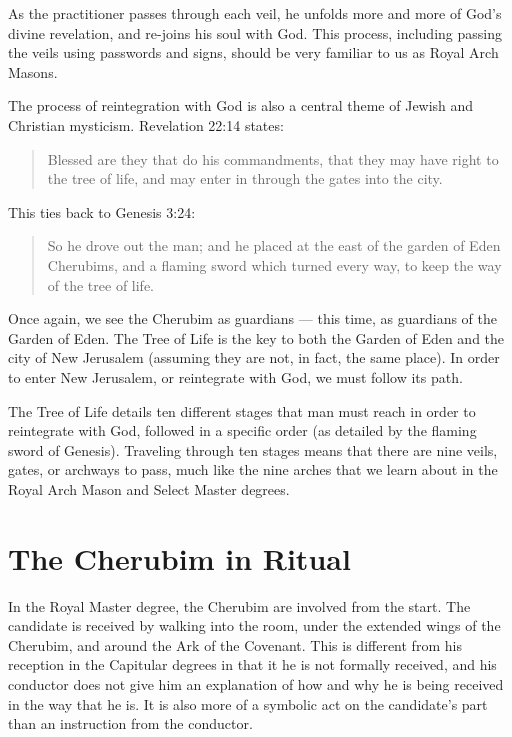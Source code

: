 \documentclass[letterpaper,11pt]{article}
\begin{document}
	As the practitioner passes through each veil, he unfolds more and more of God's divine revelation, and re-joins his soul with God. This process, including passing the veils using passwords and signs, should be very familiar to us as Royal Arch Masons.
	
	The process of reintegration with God is also a central theme of Jewish and Christian mysticism. Revelation 22:14 states:
	
	\begin{quote}
		Blessed are they that do his commandments, that they may have right to the tree of life, and may enter in through the gates into the city.
	\end{quote}

	This ties back to Genesis 3:24:
	
	\begin{quote}
		So he drove out the man; and he placed at the east of the garden of Eden Cherubims, and a flaming sword which turned every way, to keep the way of the tree of life.
	\end{quote}

	Once again, we see the Cherubim as guardians --- this time, as guardians of the Garden of Eden. The Tree of Life is the key to both the Garden of Eden and the city of New Jerusalem (assuming they are not, in fact, the same place). In order to enter New Jerusalem, or reintegrate with God, we must follow its path.
	
	The Tree of Life details ten different stages that man must reach in order to reintegrate with God, followed in a specific order (as detailed by the flaming sword of Genesis). Traveling through ten stages means that there are nine veils, gates, or archways to pass, much like the nine arches that we learn about in the Royal Arch Mason and Select Master degrees.
	
	\section*{The Cherubim in Ritual}
	
	In the Royal Master degree, the Cherubim are involved from the start. The candidate is received by walking into the room, under the extended wings of the Cherubim, and around the Ark of the Covenant. This is different from his reception in the Capitular degrees in that it he is not formally received, and his conductor does not give him an explanation of how and why he is being received in the way that he is. It is also more of a symbolic act on the candidate's part than an instruction from the conductor.
	
\end{document}
